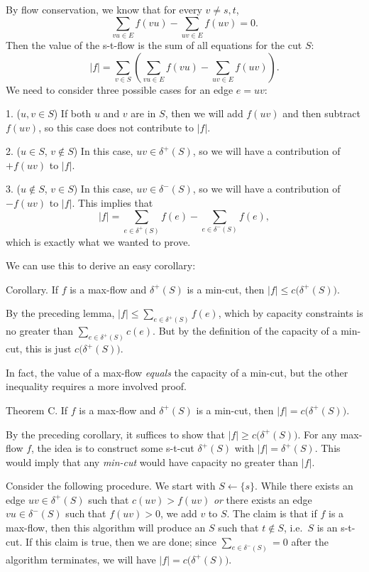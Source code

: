 \proof By flow conservation, we know that for every $v \neq s,t$,
$$\sum_{vu\in E} f(vu) - \sum_{uv\in E} f(uv) = 0.$$
Then the value of the s-t-flow is the sum of all equations for the cut $S$:
$$|f| = \sum_{v\in S} \left( \sum_{vu\in E} f(vu) - \sum_{uv\in E} f(uv) \right).$$
We need to consider three possible cases for an edge $e = uv$:
\medskip
\item {1.} ($u, v\in S$) If both $u$ and $v$ are in $S$, then we will add $f(uv)$ and then subtract $f(uv)$, so this case does not contribute to $|f|$.
\smallskip
\item {2.} ($u\in S$, $v\notin S$) In this case, $uv\in \delta^+(S)$, so we will have a contribution of $+f(uv)$ to $|f|$.
\smallskip
\item {3.} ($u\notin S$, $v\in S$) In this case, $uv\in \delta^-(S)$, so we will have a contribution of $-f(uv)$ to $|f|$.
\medskip
This implies that
$$ |f| = \sum_{e\in \delta^+(S)} f(e) - \sum_{e\in \delta^-(S)} f(e) ,$$
which is exactly what we wanted to prove.\slug

We can use this to derive an easy corollary:

\proclaim Corollary. If $f$ is a max-flow and $\delta^+(S)$ is a min-cut, then $|f| \leq c\big(\delta^+(S)\big)$.

\proof By the preceding lemma, $|f| \leq \sum_{e\in \delta^+(S)} f(e)$, which by capacity constraints is no greater than $\sum_{e\in \delta^+(S)} c(e)$. But by the definition of the capacity of a min-cut, this is just $c\big(\delta^+(S)\big)$. \slug

In fact, the value of a max-flow {\it equals} the capacity of a min-cut, but the other inequality requires a more involved proof.

\proclaim Theorem C. If $f$ is a max-flow and $\delta^+(S)$ is a min-cut, then $|f| = c\big(\delta^+(S)\big)$.

\proof By the preceding corollary, it suffices to show that $|f| \geq c\big(\delta^+(S)\big)$. For any max-flow $f$, the idea is to construct some s-t-cut $\delta^+(S)$ with $|f| = \delta^+(S)$. This would imply that any {\it min-cut} would have capacity no greater than $|f|$.

Consider the following procedure. We start with $S\gets \{s\}$. While there exists an edge $uv\in \delta^+(S)$ such that $c(uv) > f(uv)$ {\it or} there exists an edge $vu\in \delta^-(S)$ such that $f(uv) > 0$, we add $v$ to $S$. The claim is that if $f$ is a max-flow, then this algorithm will produce an $S$ such that $t\notin S$, i.e.\  $S$ is an s-t-cut. If this claim is true, then we are done; since $\sum_{e\in \delta^-(S)} = 0$ after the algorithm terminates, we will have $|f| = c\big(\delta^+(S)\big)$.

